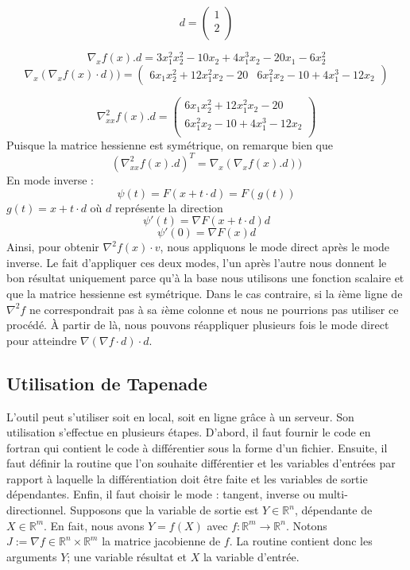 $$d = \left( \begin{array}{c} 1 \\2 \\ \end{array} \right)$$

$$\nabla_xf(x).d=3x_1^2x_2^2-10x_2+4x_1^3x_2-20x_1-6x_2^2$$
$$\nabla_x(\nabla_x f(x) \cdot d))=
\left( \begin{array}{cc} 6x_1x_2^2+12x_1^2x_2-20 & 6x_1^2x_2-10+4x_1^3-12x_2 \end{array} \right) $$ 

$$\nabla_{xx}^2f(x).d =
 \left( \begin{array}{c} 6x_1x_2^2+12x_1^2x_2-20\\6x_1^2x_2-10+4x_1^3-12x_2 \\ \end{array} \right) $$
%
%
Puisque la matrice hessienne est sym\'etrique, on remarque bien que 
$$\left( \nabla_{xx}^2f(x).d \right)^T = \nabla_x(\nabla_xf(x).d))$$
%
%
En mode inverse :
$$\psi(t)=F(x+t \cdot d)=F(g(t))$$
$g(t)=x+t \cdot d$ o\`u $d$ repr\'esente la direction
$$\psi'(t)=\nabla F(x+t \cdot d)d$$
$$\psi'(0)=\nabla F(x)d$$
%
Ainsi, pour obtenir $\nabla^2 f(x)\cdot v$, nous appliquons le mode direct apr\`es le mode inverse.
Le fait d'appliquer ces deux modes, l'un apr\`es l'autre nous donnent le bon r\'esultat uniquement parce qu'\`a la base
nous utilisons une fonction scalaire et que la matrice hessienne est sym\'etrique. Dans le cas contraire, si la $i$\`eme ligne de $\nabla^2 f$ 
ne correspondrait pas \`a sa $i$\`eme colonne et nous ne pourrions pas utiliser ce proc\'ed\'e. \`A partir de l\`a, nous pouvons r\'eappliquer plusieurs fois 
le mode direct pour atteindre $\nabla (\nabla f \cdot d)\cdot d$.



    \subsection{Utilisation de Tapenade}

L'outil peut s'utiliser soit en local, soit en ligne grâce \`a un serveur. Son utilisation s'effectue en plusieurs \'etapes.
D'abord, il faut fournir le code en fortran qui contient le code \`a diff\'erentier sous la forme d'un fichier. Ensuite,
il faut d\'efinir la routine que l'on souhaite diff\'erentier et les variables d'entr\'ees par rapport \`a laquelle la diff\'erentiation doit
être faite et les variables de sortie d\'ependantes. Enfin, il faut choisir le mode : tangent, inverse ou multi-directionnel.
Supposons que la variable de sortie est $Y \in \mathbb{R}^n$, d\'ependante de $X \in \mathbb{R}^m$. En fait, nous avons $Y=f(X)$ avec
$f:\mathbb{R}^m\rightarrow\mathbb{R}^n$. Notons $J:=\nabla f \in \mathbb{R}^n\times\mathbb{R}^m$ la matrice jacobienne de $f$.
La routine contient donc les arguments $Y$; une variable r\'esultat et $X$ la variable d'entr\'ee.



